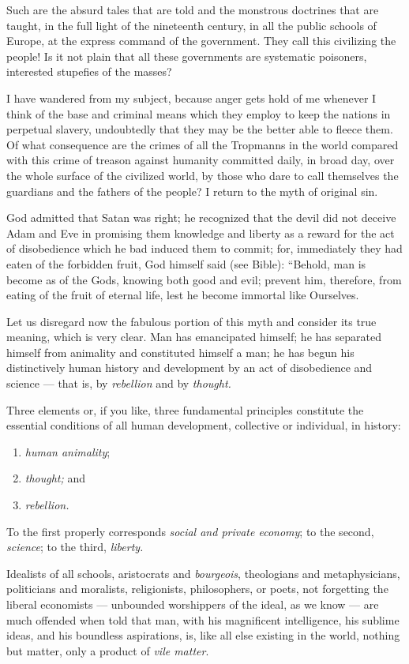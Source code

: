 \documentclass[12pt]{report}
\begin{document}
Such are the absurd tales that are told and the monstrous doctrines that are taught, in the full light of the nineteenth century, in all the public schools of Europe, at the express command of the government. They call this civilizing the people! Is it not plain that all these governments are systematic poisoners, interested stupefies of the masses?


I have wandered from my subject, because anger gets hold of me whenever I think of the base and criminal means which they employ to keep the nations in perpetual slavery, undoubtedly that they may be the better able to fleece them. Of what consequence are the crimes of all the Tropmanns in the world compared with this crime of treason against humanity committed daily, in broad day, over the whole surface of the civilized world, by those who dare to call themselves the guardians and the fathers of the people? I return to the myth of original sin.


God admitted that Satan was right; he recognized that the devil did not deceive Adam and Eve in promising them knowledge and liberty as a reward for the act of disobedience which he bad induced them to commit; for, immediately they had eaten of the forbidden fruit, God himself said (see Bible): “Behold, man is become as of the Gods, knowing both good and evil; prevent him, therefore, from eating of the fruit of eternal life, lest he become immortal like Ourselves.


Let us disregard now the fabulous portion of this myth and consider its true meaning, which is very clear. Man has emancipated himself; he has separated himself from animality and constituted himself a man; he has begun his distinctively human history and development by an act of disobedience and science — that is, by\emph{ rebellion} and by \emph{thought.}


Three elements or, if you like, three fundamental principles constitute the essential conditions of all human development, collective or individual, in history:
\begin{enumerate}
\item \emph{human animality};
\item \emph{thought;} and
\item \emph{rebellion.}
\end{enumerate}
To the first properly corresponds \emph{social and private economy}; to the second, \emph{science}; to the third,\emph{ liberty.}


Idealists of all schools, aristocrats and \emph{bourgeois}, theologians and metaphysicians, politicians and moralists, religionists, philosophers, or poets, not forgetting the liberal economists — unbounded worshippers of the ideal, as we know — are much offended when told that man, with his magnificent intelligence, his sublime ideas, and his boundless aspirations, is, like all else existing in the world, nothing but matter, only a product of \emph{vile matter}.
\end{document}
